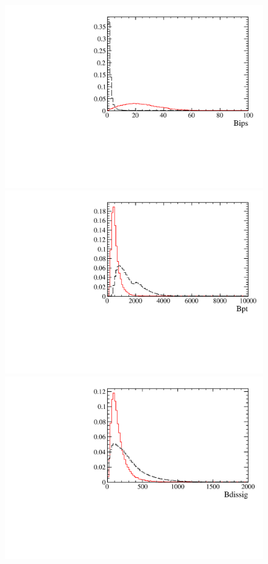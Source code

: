 \begin{figure} [htb!]
\begin{center}
\includegraphics[scale=0.20]{figs/BipsPARTIAL2pipi.pdf}
\includegraphics[scale=0.20]{figs/BptPARTIAL2pipi.pdf}
\includegraphics[scale=0.20]{figs/BdissigPARTIAL2pipi.pdf}

\end{center}
\end{figure}

